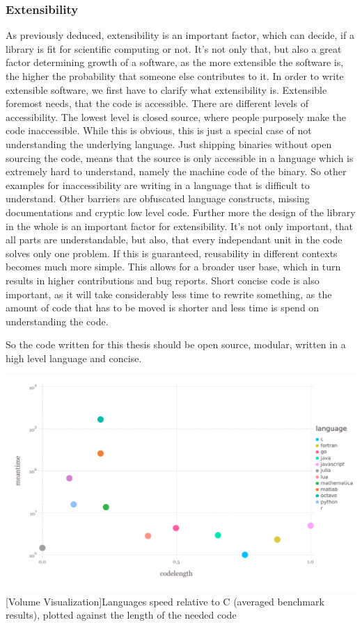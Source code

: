 \subsubsection{Extensibility}
As previously deduced, extensibility is an important factor, which can decide, if a library is fit for scientific computing or not. 
It's not only that, but also a great factor determining growth of a software, as the more extensible the software is, the higher the probability that someone else contributes to it.
In order to write extensible software, we first have to clarify what extensibility is.
Extensible foremost needs, that the code is accessible. There are different levels of accessibility. The lowest level is closed source, where people purposely make the code inaccessible. While this is obvious, this is just a special case of not understanding the underlying language. Just shipping binaries without open sourcing the code, means that the source is only accessible in a language which is extremely hard to understand, namely the machine code of the binary. So other examples for inaccessibility are writing in a language that is difficult to understand. Other barriers are obfuscated language constructs, missing documentations and cryptic low level code.
Further more the design of the library in the whole is an important factor for extensibility. It's not only important, that all parts are understandable, but also, that every independant unit in the code solves only one problem. 
If this is guaranteed, reusability in different contexts becomes much more simple. This allows for a broader user base, which in turn results in higher contributions and bug reports. 
Short concise code is also important, as it will take considerably less time to rewrite something, as the amount of code that has to be moved is shorter and less time is spend on understanding the code.

So the code written for this thesis should be open source, modular, written in a high level language and concise.


\vspace{1em}
\begin{minipage}{\linewidth}
    \centering
    \includegraphics[width=0.9\linewidth]{graphics/julia_bench.pdf}
    [Volume Visualization]{Languages speed relative to C (averaged benchmark results), plotted against the length of the needed code}
    \label{fig:juliabench}
\end{minipage}

